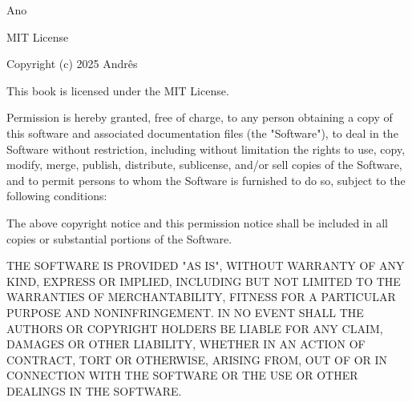 \vfill

{\small
	Ano \editionyear

	\vspace{0.5cm}

	MIT License

	\vspace{0.5cm}

	Copyright (c) 2025 Andrês

	\vspace{0.5cm}

	This book is licensed under the MIT License.

	\vspace{0.5cm}

	Permission is hereby granted, free of charge, to any person obtaining a copy
	of this software and associated documentation files (the "Software"), to deal
	in the Software without restriction, including without limitation the rights
	to use, copy, modify, merge, publish, distribute, sublicense, and/or sell
	copies of the Software, and to permit persons to whom the Software is
	furnished to do so, subject to the following conditions:

	\vspace{0.5cm}

	The above copyright notice and this permission notice shall be included in all
	copies or substantial portions of the Software.

	\vspace{0.5cm}

	THE SOFTWARE IS PROVIDED "AS IS", WITHOUT WARRANTY OF ANY KIND, EXPRESS OR
	IMPLIED, INCLUDING BUT NOT LIMITED TO THE WARRANTIES OF MERCHANTABILITY,
	FITNESS FOR A PARTICULAR PURPOSE AND NONINFRINGEMENT. IN NO EVENT SHALL THE
	AUTHORS OR COPYRIGHT HOLDERS BE LIABLE FOR ANY CLAIM, DAMAGES OR OTHER
	LIABILITY, WHETHER IN AN ACTION OF CONTRACT, TORT OR OTHERWISE, ARISING FROM,
	OUT OF OR IN CONNECTION WITH THE SOFTWARE OR THE USE OR OTHER DEALINGS IN THE
	SOFTWARE.
}
